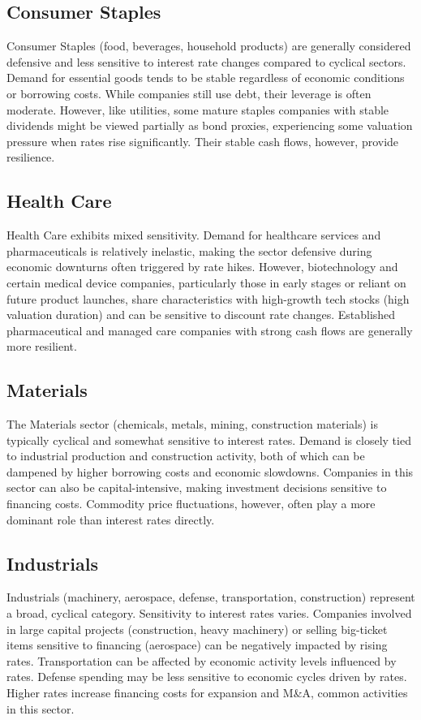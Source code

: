 \subsection{Consumer Staples} \label{subsec:industry_consumer_staples}
Consumer Staples (food, beverages, household products) are generally considered defensive and less sensitive to interest rate changes compared to cyclical sectors. Demand for essential goods tends to be stable regardless of economic conditions or borrowing costs. While companies still use debt, their leverage is often moderate. However, like utilities, some mature staples companies with stable dividends might be viewed partially as bond proxies, experiencing some valuation pressure when rates rise significantly. Their stable cash flows, however, provide resilience.

\subsection{Health Care} \label{subsec:industry_health_care}
Health Care exhibits mixed sensitivity. Demand for healthcare services and pharmaceuticals is relatively inelastic, making the sector defensive during economic downturns often triggered by rate hikes. However, biotechnology and certain medical device companies, particularly those in early stages or reliant on future product launches, share characteristics with high-growth tech stocks (high valuation duration) and can be sensitive to discount rate changes. Established pharmaceutical and managed care companies with strong cash flows are generally more resilient.

\subsection{Materials} \label{subsec:industry_materials}
The Materials sector (chemicals, metals, mining, construction materials) is typically cyclical and somewhat sensitive to interest rates. Demand is closely tied to industrial production and construction activity, both of which can be dampened by higher borrowing costs and economic slowdowns. Companies in this sector can also be capital-intensive, making investment decisions sensitive to financing costs. Commodity price fluctuations, however, often play a more dominant role than interest rates directly.

\subsection{Industrials} \label{subsec:industry_industrials}
Industrials (machinery, aerospace, defense, transportation, construction) represent a broad, cyclical category. Sensitivity to interest rates varies. Companies involved in large capital projects (construction, heavy machinery) or selling big-ticket items sensitive to financing (aerospace) can be negatively impacted by rising rates. Transportation can be affected by economic activity levels influenced by rates. Defense spending may be less sensitive to economic cycles driven by rates. Higher rates increase financing costs for expansion and M\&A, common activities in this sector.

